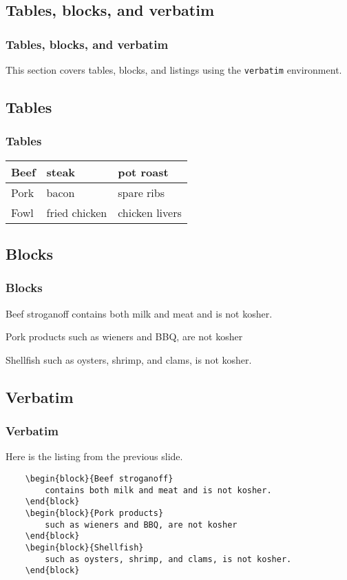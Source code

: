 \begin{realverbatim}
    \section{Tables, blocks, and verbatim}
    \begin{frame}
        \frametitle{Tables, blocks, and verbatim}
        This section covers tables, blocks, and listings using the \texttt{verbatim} environment.
    \end{frame}
    \subsection{Tables}
    \begin{frame}
        \frametitle{Tables}
        \begin{tabular}{| l | l | l |} 
            \hline
            Beef & steak & pot roast \\
            \hline
            Pork & bacon & spare ribs \\
            \hline
            Fowl & fried chicken & chicken livers \\
            \hline
        \end{tabular}
    \end{frame}
    \subsection{Blocks}
    \begin{frame}
        \frametitle{Blocks}
        \begin{block}{Beef stroganoff} 
            contains both milk and meat and is not kosher.
        \end{block}
        \begin{block}{Pork products} 
            such as wieners and BBQ, are not kosher
        \end{block}
        \begin{block}{Shellfish} 
            such as oysters, shrimp, and clams, is not kosher.
        \end{block}
    \end{frame}
    \subsection{Verbatim}
    \begin{frame}[containsverbatim]
        \frametitle{Verbatim}
        Here is the listing from the previous slide.
        \begin{verbatim}
    \begin{block}{Beef stroganoff} 
        contains both milk and meat and is not kosher.
    \end{block}
    \begin{block}{Pork products} 
        such as wieners and BBQ, are not kosher
    \end{block}
    \begin{block}{Shellfish} 
        such as oysters, shrimp, and clams, is not kosher.
    \end{block}
        \end{verbatim}
    \end{frame}

\end{realverbatim}

